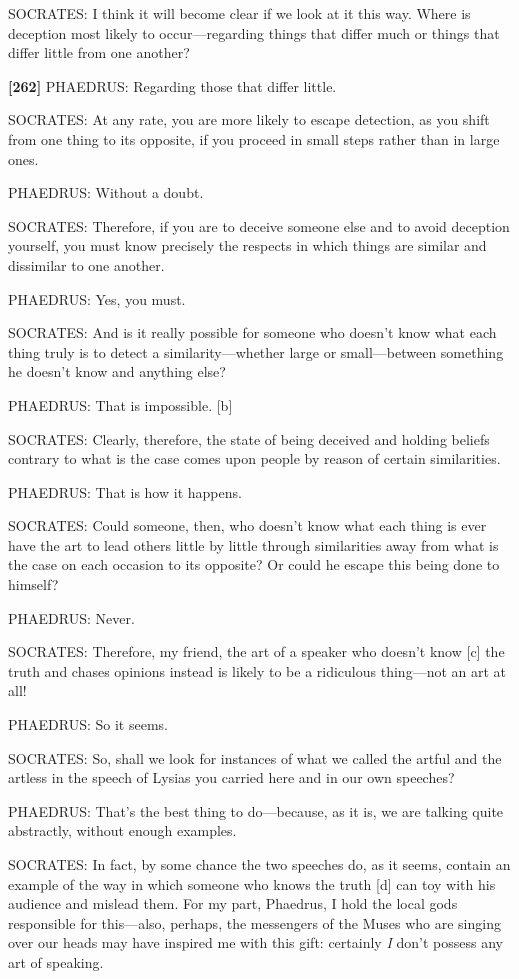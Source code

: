 SOCRATES: I think it will become clear if we look at it this way. Where
is deception most likely to occur---regarding things that differ much or
things that differ little from one another?

{\bf {[}262{]}} PHAEDRUS: Regarding those that differ little.

SOCRATES: At any rate, you are more likely to escape detection, as you
shift from one thing to its opposite, if you proceed in small steps
rather than in large ones.

PHAEDRUS: Without a doubt.

SOCRATES: Therefore, if you are to deceive someone else and to avoid
deception yourself, you must know precisely the respects in which things
are similar and dissimilar to one another.

PHAEDRUS: Yes, you must.

SOCRATES: And is it really possible for someone who doesn't know what
each thing truly is to detect a similarity---whether large or
small---between something he doesn't know and anything else?

PHAEDRUS: That is impossible. {[}b{]}

SOCRATES: Clearly, therefore, the state of being deceived and holding
beliefs contrary to what is the case comes upon people by reason of
certain similarities.

PHAEDRUS: That is how it happens.

SOCRATES: Could someone, then, who doesn't know what each thing is ever
have the art to lead others little by little through similarities away
from what is the case on each occasion to its opposite? Or could he
escape this being done to himself?

PHAEDRUS: Never.

SOCRATES: Therefore, my friend, the art of a speaker who doesn't know
{[}c{]} the truth and chases opinions instead is likely to be a
ridiculous thing---not an art at all!

PHAEDRUS: So it seems.

SOCRATES: So, shall we look for instances of what we called the artful
and the artless in the speech of Lysias you carried here and in our own
speeches?

PHAEDRUS: That's the best thing to do---because, as it is, we are
talking quite abstractly, without enough examples.

SOCRATES: In fact, by some chance the two speeches do, as it seems,
contain an example of the way in which someone who knows the truth
{[}d{]} can toy with his audience and mislead them. For my part,
Phaedrus, I hold the local gods responsible for this---also, perhaps,
the messengers of the Muses who are singing over our heads may have
inspired me with this gift: certainly {\em I} don't possess any art of
speaking.

